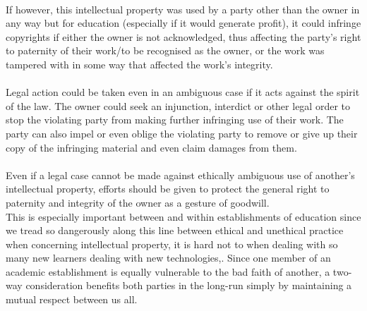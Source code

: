 \\If however, this intellectual property was used by a party other than the owner in any way but for education (especially if it would generate profit), it could infringe copyrights if either the owner is not acknowledged, thus affecting the party’s right to paternity of their work/to be recognised as the owner, or the work was tampered with in some way that affected the work’s integrity\cite{LSEPI in Computer Tech}.
\\\\Legal action could be taken even in an ambiguous case if it acts against the spirit of the law. The owner could seek an injunction, interdict or other legal order to stop the violating party from making further infringing use of their work. The party can also impel or even oblige the violating party to remove or give up their copy of the infringing material and even claim damages from them.\cite{JiscLegal - Intellectual Prop.}
\\\\Even if a legal case cannot be made against ethically ambiguous use of another's intellectual property, efforts should be given to protect the general right to paternity and integrity of the owner as a gesture of goodwill.
\\This is especially important between and within establishments of education since we tread so dangerously along this line between ethical and unethical practice when concerning intellectual property, it is hard not to when dealing with so many new learners dealing with new technologies,\cite{JiscLegal - Intellectual Prop.}. Since one member of an academic establishment is equally vulnerable to the bad faith of another, a two-way consideration benefits both parties in the long-run simply by maintaining a mutual respect between us all.
